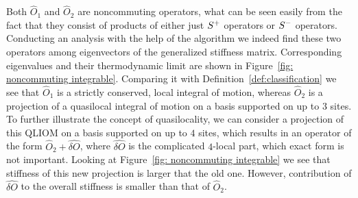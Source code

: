 Both \(\hat{O}_1\) and \(\hat{O}_2\) are noncommuting operators, what can be seen easily from the
fact that they consist of products of either just \(S^{+}\) operators or \(S^{-}\) operators. Conducting
an analysis with the help of the algorithm we indeed find these two operators among eigenvectors
of the generalized stiffness matrix. Corresponding eigenvalues and their thermodynamic limit
are shown in Figure~\ref{fig: noncommuting integrable}. Comparing it with 
Definition~\ref{def:classification} we see that \(\hat{O}_1\) is a strictly 
conserved, local integral of motion, whereas \(\hat{O}_2\) is a projection 
of a quasilocal integral of motion on a basis supported on up to \(3\) sites.
To further illustrate the concept of quasilocality, we can consider a projection
of this QLIOM on a basis supported on up to \(4\) sites, which results in an operator of the form 
\(\hat{O}_2 + \hat{\delta O}\), where \(\hat{\delta O}\) is the complicated \(4\)-local part,
which exact form is not important. Looking at Figure~\ref{fig: noncommuting integrable} we see
that stiffness of this new projection is larger that the old one. However, contribution 
of \(\hat{\delta O}\) to the overall stiffness is smaller than that of \(\hat{O}_2\).
